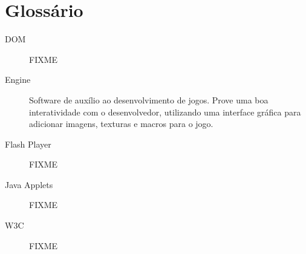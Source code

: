 
\section*{Glossário}

\begin{description}
\item[DOM ] FIXME
\item[Engine ] Software de auxílio ao desenvolvimento de jogos. Prove
uma boa interatividade com o desenvolvedor, utilizando uma interface
gráfica para adicionar imagens, texturas e macros para o jogo.
\item[Flash Player ] FIXME
\item[Java Applets ] FIXME
\item[W3C ] FIXME

\end{description}

\newpage
